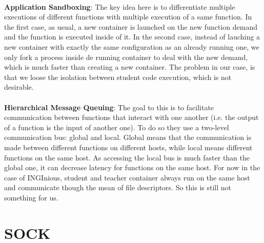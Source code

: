\paragraph{}\textbf{Application Sandboxing}: The key idea here is to differentiate multiple executions of different functions with multiple execution of a same function.  In the first case, as usual, a new container is launched on the new function demand and the function is executed inside of it.  In the second case, instead of lauching a new container with exactly the same configuration as an already running one, we only fork a process inside de running container to deal with the new demand, which is much faster than creating a new container.  The problem in our case, is that we loose the isolation between student code execution, which is not desirable.
\paragraph{}\textbf{Hierarchical Message Queuing}: The goal to this is to facilitate communication between functions that interact with one another (i.e. the output of a function is the input of another one).  To do so they use a two-level communication bus: global and local.  Global means that the communication is made between different functions on different hosts, while local means different functions on the same host.  As accessing the local bus is much faster than the global one, it can decrease latency for functions on the same host.  For now in the case of INGInious, student and teacher container always run on the same host and communicate though the mean of file descriptors.  So this is still not something for us.  %


\section{SOCK} \label{subsec-sock}
